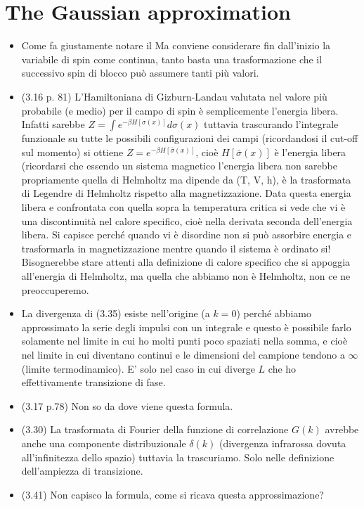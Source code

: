 \documentclass[10pt,a4paper]{article}
\begin{document}
\section{The Gaussian approximation}
\begin{itemize}
\item Come fa giustamente notare il Ma conviene considerare fin dall'inizio la variabile di spin come continua, tanto basta una trasformazione che il successivo spin di blocco può assumere tanti più valori. 
\item (3.16 p. 81) L'Hamiltoniana di Gizburn-Landau valutata nel valore più probabile (e medio) per il campo di spin è semplicemente l'energia libera. Infatti sarebbe $Z = \int e^{- \beta H[\sigma(x)]} d \sigma (x)$ tuttavia trascurando l'integrale funzionale su tutte le possibili configurazioni dei campi (ricordandosi il cut-off sul momento) si ottiene $Z = e^{- \beta H[\bar{\sigma}(x)]}$, cioè $H[\bar{\sigma}(x)]$ è l'energia libera (ricordarsi che essendo un sistema magnetico l'energia libera non sarebbe propriamente quella di Helmholtz ma dipende da (T, V, h), è la trasformata di Legendre di Helmholtz rispetto alla magnetizzazione.
Data questa energia libera e confrontata con quella sopra la temperatura critica si vede che vi è una discontinuità nel calore specifico, cioè nella derivata seconda dell'energia libera. Si capisce perché quando vi è disordine non si può assorbire energia e trasformarla in magnetizzazione mentre quando il sistema è ordinato si!
Bisognerebbe stare attenti alla definizione di calore specifico che si appoggia all'energia di Helmholtz, ma quella che abbiamo non è Helmholtz, non ce ne preoccuperemo.
\item La divergenza di (3.35) esiste nell'origine (a $k=0$) perché abbiamo approssimato la serie degli impulsi con un integrale e questo è possibile farlo solamente nel limite in cui ho molti punti poco spaziati nella somma, e cioè nel limite in cui diventano continui e le dimensioni del campione tendono a $\infty$ (limite termodinamico). E' solo nel caso in cui diverge $L$ che ho effettivamente transizione di fase.
\item (3.17 p.78) Non so da dove viene questa formula.
\item (3.30) La trasformata di Fourier della funzione di correlazione $G(k)$ avrebbe anche una componente distribuzionale $\delta(k)$ (divergenza infrarossa dovuta all'infinitezza dello spazio) tuttavia la trascuriamo. Solo nelle definizione dell'ampiezza di transizione.
\item (3.41) Non capisco la formula, come si ricava questa approssimazione?

\end{itemize}
\end{document}

